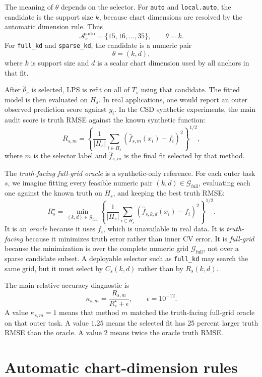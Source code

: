 \documentclass[11pt]{article}
\newcommand{\Gfull}{\mathcal G_{\mathrm{full}}}
\newcommand{\code}[1]{\texttt{#1}}
\begin{document}
The meaning of $\theta$ depends on the selector.  For \code{auto} and
\code{local.auto}, the candidate is the support size $k$, because chart
dimensions are resolved by the automatic dimension rule.  Thus
\[
  \mathcal A_s^{\mathrm{auto}}=\{15,16,\ldots,35\},
  \qquad
  \theta=k.
\]
For \code{full\_kd} and \code{sparse\_kd}, the candidate is a numeric pair
\[
  \theta=(k,d),
\]
where $k$ is support size and $d$ is a scalar chart dimension used by all
anchors in that fit.

After $\widehat\theta_s$ is selected, LPS is refit on all of $T_s$ using that
candidate.  The fitted model is then evaluated on $H_s$.  In real applications,
one would report an outer observed prediction score against $y_i$.  In the CSD
synthetic experiments, the main audit score is truth RMSE against the known
synthetic function:
\[
  R_{s,m}
  =
  \left\{
  \frac{1}{|H_s|}
  \sum_{i\in H_s}
  \left(\widehat f_{s,m}(x_i)-f_i\right)^2
  \right\}^{1/2},
\]
where $m$ is the selector label and $\widehat f_{s,m}$ is the final fit selected
by that method.

The \emph{truth-facing full-grid oracle} is a synthetic-only reference.  For
each outer task $s$, we imagine fitting every feasible numeric pair
$(k,d)\in\Gfull$, evaluating each one against the known truth on $H_s$, and
keeping the best truth RMSE:
\[
  R_s^\star
  =
  \min_{(k,d)\in\Gfull}
  \left\{
  \frac{1}{|H_s|}
  \sum_{i\in H_s}
  \left(\widehat f_{s,k,d}(x_i)-f_i\right)^2
  \right\}^{1/2}.
\]
It is an \emph{oracle} because it uses $f_i$, which is unavailable in real data.
It is \emph{truth-facing} because it minimizes truth error rather than inner CV
error.  It is \emph{full-grid} because the minimization is over the complete
numeric grid $\Gfull$, not over a sparse candidate subset.  A deployable
selector such as \code{full\_kd} may search the same grid, but it must select by
$C_s(k,d)$ rather than by $R_s(k,d)$.

The main relative accuracy diagnostic is
\[
  \kappa_{s,m}
  =
  \frac{R_{s,m}}{R_s^\star+\epsilon},
  \qquad
  \epsilon=10^{-12}.
\]
A value $\kappa_{s,m}=1$ means that method $m$ matched the truth-facing
full-grid oracle on that outer task.  A value $1.25$ means the selected fit has
25 percent larger truth RMSE than the oracle.  A value $2$ means twice the
oracle truth RMSE.

\section{Automatic chart-dimension rules}
\end{document}
